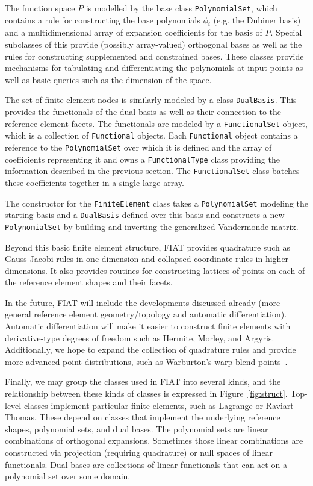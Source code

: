 The function space \( P \) is modelled by the base class
\texttt{PolynomialSet}, which contains a rule for constructing the base
polynomials \( \phi_i \) (e.g. the Dubiner basis) and a multidimensional
array of expansion coefficients for the basis of \( P \).  Special
subclasses of this provide (possibly array-valued) orthogonal bases as
well as the rules for constructing supplemented and constrained bases.
These classes provide mechanisms for tabulating and differentiating
the polynomials at input points as well as basic queries such as the
dimension of the space.

The set of finite element nodes is similarly modeled by a class
\texttt{DualBasis}.  This provides the functionals of the dual basis as
well as their connection to the reference element facets.  The functionals
are modeled by a \texttt{FunctionalSet} object, which is a collection of
\texttt{Functional} objects.  Each \texttt{Functional} object contains a
reference to the \texttt{PolynomialSet} over which it is defined and the
array of coefficients representing it and owns a \texttt{FunctionalType}
class providing the information described in the previous section.
The \texttt{FunctionalSet} class batches these coefficients together in
a single large array.

The constructor for the \texttt{FiniteElement} class takes
a \texttt{PolynomialSet} modeling the starting basis and a
\texttt{DualBasis} defined over this basis and constructs a new
\texttt{PolynomialSet} by building and inverting the generalized
Vandermonde matrix.

Beyond this basic finite element structure, FIAT provides quadrature such
as Gauss-Jacobi rules in one dimension and collapsed-coordinate rules in
higher dimensions.  It also provides routines for constructing lattices
of points on each of the reference element shapes and their facets.

In the future, FIAT will include the developments discussed already
(more general reference element geometry/topology and automatic
differentiation).  Automatic differentiation will make it easier
to construct finite elements with derivative-type degrees
of freedom such as Hermite, Morley, and Argyris.  Additionally,
we hope to expand the collection of quadrature rules and provide
more advanced point distributions, such as Warburton's warp-blend
points~\citep{Warburton2005}.

Finally, we may group the classes used in FIAT into several kinds,
and the relationship between these kinds of classes is expressed in
Figure~\ref{fig:struct}.  Top-level classes implement particular finite
elements, such as Lagrange or Raviart--Thomas.  These depend on classes
that implement the underlying reference shapes, polynomial sets, and
dual bases.  The polynomial sets are linear combinations of orthogonal
expansions.  Sometimes those linear combinations are constructed via
projection (requiring quadrature) or null spaces of linear functionals.
Dual bases are collections of linear functionals that can act on a
polynomial set over some domain.

